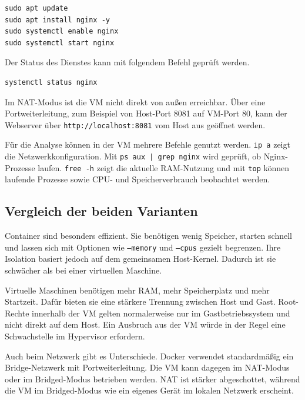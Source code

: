 \documentclass[conference]{IEEEtran}
\begin{document}
\begin{lstlisting}
sudo apt update
sudo apt install nginx -y
sudo systemctl enable nginx
sudo systemctl start nginx
\end{lstlisting}

Der Status des Dienstes kann mit folgendem Befehl geprüft werden.

\begin{lstlisting}
systemctl status nginx
\end{lstlisting}

Im NAT-Modus ist die VM nicht direkt von außen erreichbar. Über eine
Portweiterleitung, zum Beispiel von Host-Port 8081 auf VM-Port 80, kann der
Webserver über \texttt{http://localhost:8081} vom Host aus geöffnet werden.

Für die Analyse können in der VM mehrere Befehle genutzt werden.
\texttt{ip a} zeigt die Netzwerkkonfiguration. Mit
\texttt{ps aux | grep nginx} wird geprüft, ob Nginx-Prozesse laufen.
\texttt{free -h} zeigt die aktuelle RAM-Nutzung und mit \texttt{top} können
laufende Prozesse sowie CPU- und Speicherverbrauch beobachtet werden.

\subsection{Vergleich der beiden Varianten}
Container sind besonders effizient. Sie benötigen wenig Speicher, starten
schnell und lassen sich mit Optionen wie \texttt{--memory} und
\texttt{--cpus} gezielt begrenzen. Ihre Isolation basiert jedoch auf dem
gemeinsamen Host-Kernel. Dadurch ist sie schwächer als bei einer virtuellen
Maschine.

Virtuelle Maschinen benötigen mehr RAM, mehr Speicherplatz und mehr Startzeit.
Dafür bieten sie eine stärkere Trennung zwischen Host und Gast. Root-Rechte
innerhalb der VM gelten normalerweise nur im Gastbetriebssystem und nicht direkt
auf dem Host. Ein Ausbruch aus der VM würde in der Regel eine Schwachstelle im
Hypervisor erfordern.

Auch beim Netzwerk gibt es Unterschiede. Docker verwendet standardmäßig ein
Bridge-Netzwerk mit Portweiterleitung. Die VM kann dagegen im NAT-Modus oder im
Bridged-Modus betrieben werden. NAT ist stärker abgeschottet, während die VM im
Bridged-Modus wie ein eigenes Gerät im lokalen Netzwerk erscheint.
\end{document}
